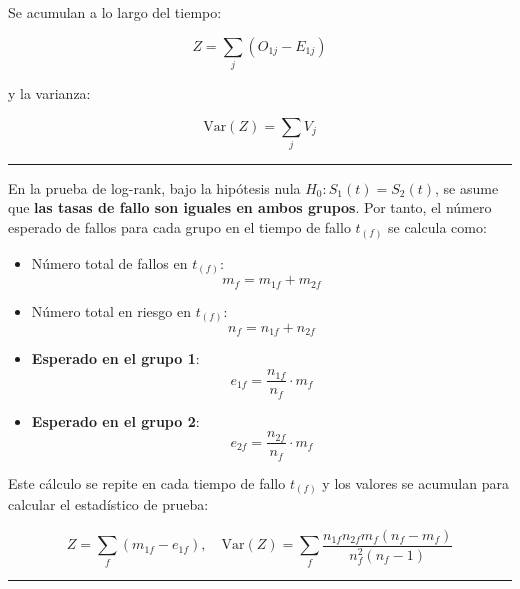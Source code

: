 \documentclass[
]{article}
\begin{document}
Se acumulan a lo largo del tiempo:

\[
Z = \sum_j (O_{1j} - E_{1j})
\]

y la varianza:

\[
\text{Var}(Z) = \sum_j V_j
\]

\begin{center}\rule{0.5\linewidth}{0.5pt}\end{center}

\begin{tcolorbox}[enhanced jigsaw, rightrule=.15mm, toprule=.15mm, colback=white, bottomrule=.15mm, bottomtitle=1mm, left=2mm, leftrule=.75mm, arc=.35mm, breakable, title=\textcolor{quarto-callout-note-color}{\faInfo}\hspace{0.5em}{Cálculo del número esperado bajo \(H_0\)}, opacitybacktitle=0.6, colframe=quarto-callout-note-color-frame, opacityback=0, toptitle=1mm, coltitle=black, titlerule=0mm, colbacktitle=quarto-callout-note-color!10!white]

En la prueba de log-rank, bajo la hipótesis nula
\(H_0: S_1(t) = S_2(t)\), se asume que \textbf{las tasas de fallo son
iguales en ambos grupos}. Por tanto, el número esperado de fallos para
cada grupo en el tiempo de fallo \(t_{(f)}\) se calcula como:

\begin{itemize}
\item
  Número total de fallos en \(t_{(f)}\):\\
  \[
  m_f = m_{1f} + m_{2f}
  \]
\item
  Número total en riesgo en \(t_{(f)}\):\\
  \[
  n_f = n_{1f} + n_{2f}
  \]
\item
  \textbf{Esperado en el grupo 1}:\\
  \[
  e_{1f} = \frac{n_{1f}}{n_f} \cdot m_f
  \]
\item
  \textbf{Esperado en el grupo 2}:\\
  \[
  e_{2f} = \frac{n_{2f}}{n_f} \cdot m_f
  \]
\end{itemize}

Este cálculo se repite en cada tiempo de fallo \(t_{(f)}\) y los valores
se acumulan para calcular el estadístico de prueba:

\[
Z = \sum_f (m_{1f} - e_{1f}), \quad \text{Var}(Z) = \sum_f \frac{n_{1f}n_{2f}m_f(n_f - m_f)}{n_f^2(n_f - 1)}
\]

\end{tcolorbox}

\begin{center}\rule{0.5\linewidth}{0.5pt}\end{center}
\end{document}
